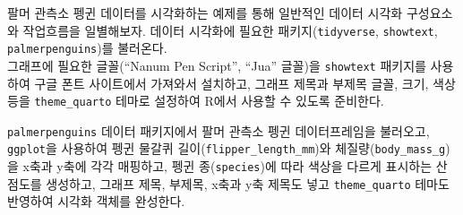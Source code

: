 \documentclass[
  letterpaper,
]{book}
\begin{document}
팔머 관측소 펭귄 데이터를 시각화하는 예제를 통해 일반적인 데이터 시각화
구성요소와 작업흐름을 일별해보자. 데이터 시각화에 필요한
패키지(\texttt{tidyverse}, \texttt{showtext}, \texttt{palmerpenguins})를
불러온다.\\
그래프에 필요한 글꼴(``Nanum Pen Script'', ``Jua'' 글꼴)을
\texttt{showtext} 패키지를 사용하여 구글 폰트 사이트에서 가져와서
설치하고, 그래프 제목과 부제목 글꼴, 크기, 색상 등을
\texttt{theme\_quarto} 테마로 설정하여 R에서 사용할 수 있도록 준비한다.

\texttt{palmerpenguins} 데이터 패키지에서 팔머 관측소 펭귄
데이터프레임을 불러오고, \texttt{ggplot}을 사용하여 펭귄 물갈퀴
길이(\texttt{flipper\_length\_mm})와 체질량(\texttt{body\_mass\_g})을
x축과 y축에 각각 매핑하고, 펭귄 종(\texttt{species})에 따라 색상을
다르게 표시하는 산점도를 생성하고, 그래프 제목, 부제목, x축과 y축 제목도
넣고 \texttt{theme\_quarto} 테마도 반영하여 시각화 객체를 완성한다.
\end{document}
